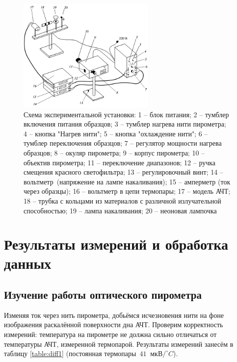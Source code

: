 \documentclass[a4paper]{article}
\begin{document}
\begin{figure}[ht!]
    \centering
    \includegraphics[width = 0.6\textwidth]{image/schema.png}
    \caption{Схема экспериментальной установки: 1 -- блок питания; 2 -- тумблер включения питания образцов;
    3 -- тумблер нагрева нити пирометра; 4 -- кнопка "Нагрев нити"; 5 -- кнопка "охлаждение нити"; 6 -- тумблер
    переключения образцов; 7 -- регулятор мощности нагрева образцов; 8 -- окуляр пирометра; 9 -- корпус
    пирометра; 10 -- объектив пирометра; 11 -- переключение диапазонов; 12 -- ручка смещения красного
    светофильтра; 13 -- регулировочный винт; 14 -- вольтметр~(напряжение на лампе накаливания); 15 --
    амперметр (ток через образцы); 16 -- вольтметр в цепи термопары; 17 -- модель АЧТ; 18 -- трубка с
    кольцами из материалов с различной излучательной способностью; 19 -- лампа накаливания; 20 --
    неоновая лампочка
    }
    \label{fig:schema}
\end{figure}


\section{Результаты измерений и обработка данных}

\subsection{Изучение работы оптического пирометра}

Изменяя ток через нить пирометра, добьёмся исчезновения нити на фоне изображения раскалённой поверхности дна АЧТ. Проверим корректность измерений: температура на пирометре не должна сильно отличаться от температуры АЧТ, измеренной термопарой. Результаты измерений занесём в таблицу \ref*{table:diff1} (постоянная термопары~$41 \;\; \text{мкВ}/^\circ C$).
\end{document}

